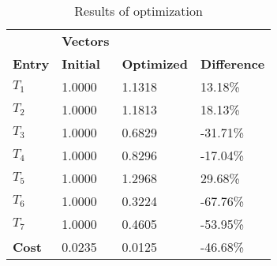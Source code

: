 \begin{table}[H]
\centering
\begin{tabular}{llll}
\textbf{}      & \cellcolor[HTML]{EFEFEF}\textbf{Vectors} & \textbf{} & \textbf{}         \\
\rowcolor[HTML]{EFEFEF} 
\textbf{Entry} & \textbf{Initial} & \textbf{Optimized} & \textbf{Difference} \\
$T_1$ & 1.0000 & 1.1318 & 13.18\% \\ 
$T_2$ & 1.0000 & 1.1813 & 18.13\% \\ 
$T_3$ & 1.0000 & 0.6829 & -31.71\% \\ 
$T_4$ & 1.0000 & 0.8296 & -17.04\% \\ 
$T_5$ & 1.0000 & 1.2968 & 29.68\% \\ 
$T_6$ & 1.0000 & 0.3224 & -67.76\% \\ 
$T_7$ & 1.0000 & 0.4605 & -53.95\% \\ 
\rowcolor[HTML]{EFEFEF} 
\textbf{Cost}  & 0.0235 & 0.0125 & -46.68\% \\ 
\end{tabular}
\caption{Results of optimization}
\label{tab:OptimizationAnalysis}
\end{table}